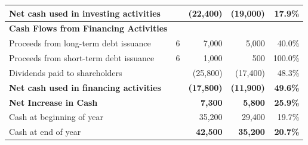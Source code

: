 \begin{tabularx}{\textwidth}{L c R R R}
  \textbf{Net cash used in investing activities} & & \textbf{(22,400)} & \textbf{(19,000)} & \textbf{17.9\%} \\
  \midrule
  \textbf{Cash Flows from Financing Activities} & & & & \\
  \quad Proceeds from long-term debt issuance & 6 & 7,000 & 5,000 & 40.0\% \\
  \quad Proceeds from short-term debt issuance & 6 & 1,000 & 500 & 100.0\% \\
  \quad Dividends paid to shareholders & & (25,800) & (17,400) & 48.3\% \\
  \textbf{Net cash used in financing activities} & & \textbf{(17,800)} & \textbf{(11,900)} & \textbf{49.6\%} \\
  \midrule
  \textbf{Net Increase in Cash} & & \textbf{7,300} & \textbf{5,800} & \textbf{25.9\%} \\
  \quad Cash at beginning of year & & 35,200 & 29,400 & 19.7\% \\
  \quad Cash at end of year & & \textbf{42,500} & \textbf{35,200} & \textbf{20.7\%} \\
  \bottomrule
\end{tabularx}

\vspace{15pt}
